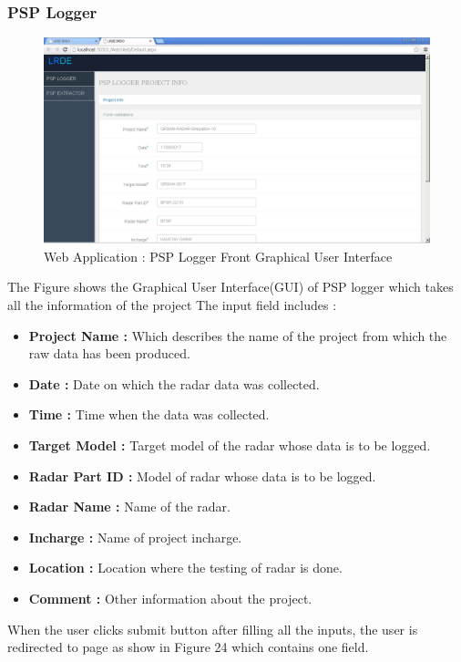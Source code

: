 \documentclass[12pt]{article} %
\begin{document}
\subsubsection{PSP Logger}
 \begin{figure}[H]
 \centering
   \includegraphics[width=\linewidth]{LoggerFrontPage.jpg}
  \caption{Web Application : PSP Logger Front Graphical User Interface}
  \label{fig:figure 22}
\end{figure}
 The Figure shows the Graphical User Interface(GUI) of PSP logger which takes all the information of the project 
  The input field includes :
  \begin{itemize} 
  \item[] \textbf{Project Name : }Which describes the name of the project from which the raw data has been produced.
  \item[] \textbf{Date : }Date on which the radar data was collected. 
  \item[] \textbf{Time : }Time when the data was collected.
  \item[] \textbf{Target Model : }Target model of the radar whose data is to be logged.  
  \item[] \textbf{Radar Part ID : }Model of radar whose data is to be logged.
  \item[] \textbf{Radar Name : }Name of the radar.
  \item[] \textbf{Incharge : }Name of project incharge.
  \item[] \textbf{Location : }Location where the testing of radar is done.
  \item[] \textbf{Comment : }Other information about the project.
  \end{itemize}
  When the user clicks submit button after filling all the inputs, the user is redirected to page as show in Figure 24 which contains one field.\\
\end{document}
